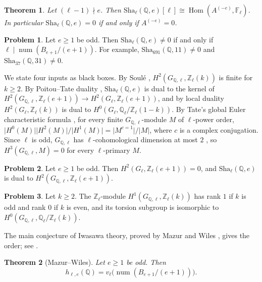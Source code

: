 \documentclass[reqno]{amsart}
\theoremstyle{definition}
\newtheorem{problem}{Problem}[section]
\theoremstyle{plain}
\newtheorem{theorem}{Theorem}[section]
\theoremstyle{remark}
\newcommand{\Z}{\mathbb{Z}}
\newcommand{\Q}{\mathbb{Q}}
\newcommand{\F}{\mathbb{F}}
\newcommand{\Zl}{\Z_\ell}
\newcommand{\Ql}{\Q_\ell}
\newcommand{\Hom}{\operatorname{Hom}}
\newcommand{\num}{\operatorname{num}}
\newcommand{\Sha}{\mathrm{Sha}}
\begin{document}
\begin{theorem}\label{thm:sha-class}
Let \((\ell - 1) \nmid e\).  Then \(\Sha_\ell(\Q, e)[\ell] \cong \Hom(A^{(-e)}, \F_\ell)\).  In particular \(\Sha_\ell(\Q, e) = 0\) if and only if \(A^{(-e)} = 0\).
\end{theorem}

\begin{problem}\label{pr:odd-e}
Let \(e \ge 1\) be odd.  Then \(\Sha_\ell(\Q, e) \ne 0\) if and only if \(\ell \mid \num(B_{e+1}/(e+1))\).  For example, \(\Sha_{691}(\Q, 11) \ne 0\) and \(\Sha_{37}(\Q, 31) \ne 0\).
\end{problem}

We state four inputs as black boxes.  By Soulé \cite{So}, \(H^2(G_{\Q,\ell}, \Zl(k))\) is finite for \(k \ge 2\).  By Poitou--Tate duality \cite[Ch.~VIII, \S6]{NSW}, \(\Sha_\ell(\Q, e)\) is dual to the kernel of \(H^2(G_{\Q,\ell}, \Zl(e+1)) \to H^2(G_\ell, \Zl(e+1))\), and by local duality \cite[Ch.~VII, \S2]{NSW} \(H^2(G_\ell, \Zl(k))\) is dual to \(H^0(G_\ell, \Ql/\Zl(1-k))\).  By Tate's global Euler characteristic formula \cite[Ch.~VIII, \S7]{NSW}, for every finite \(G_{\Q,\ell}\)-module \(M\) of \(\ell\)-power order, \(\lvert H^0(M) \rvert \lvert H^2(M) \rvert / \lvert H^1(M) \rvert = \lvert M^{c = 1} \rvert / \lvert M \rvert\), where \(c\) is a complex conjugation.  Since \(\ell\) is odd, \(G_{\Q,\ell}\) has \(\ell\)-cohomological dimension at most \(2\) \cite[Ch.~VIII, \S3]{NSW}, so \(H^3(G_{\Q,\ell}, M) = 0\) for every \(\ell\)-primary \(M\).

\begin{problem}\label{pr:sha2}
Let \(e \ge 1\) be odd.  Then \(H^2(G_\ell, \Zl(e+1)) = 0\), and \(\Sha_\ell(\Q, e)\) is dual to \(H^2(G_{\Q,\ell}, \Zl(e+1))\).
\end{problem}

\begin{problem}\label{pr:rank}
Let \(k \ge 2\).  The \(\Zl\)-module \(H^1(G_{\Q,\ell}, \Zl(k))\) has rank \(1\) if \(k\) is odd and rank \(0\) if \(k\) is even, and its torsion subgroup is isomorphic to \(H^0(G_{\Q,\ell}, \Ql/\Zl(k))\).
\end{problem}

The main conjecture of Iwasawa theory, proved by Mazur and Wiles \cite{MW}, gives the order; see \cite[Ch.~15]{Wa}.

\begin{theorem}[Mazur--Wiles]\label{thm:MW}
Let \(e \ge 1\) be odd.  Then
\[
  h_{\ell,e}(\Q) = v_\ell\bigl(\num(B_{e+1}/(e+1))\bigr) .
\]
\end{theorem}
\end{document}
